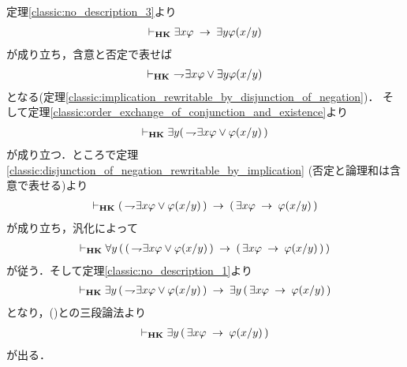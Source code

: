 	\begin{sketch}
		定理\ref{classic:no_description_3}より
		\begin{align}
			\vdash_{{\scriptsize \mbox{{\bf HK}}}} 
			\exists x \varphi \hspace{0.25em}\rightarrow\hspace{0.25em} \exists y \varphi(x/y)
		\end{align}
		が成り立ち，含意と否定で表せば
		\begin{align}
			\vdash_{{\scriptsize \mbox{{\bf HK}}}} 
			\ \rightharpoondown\hspace{-0.25em} \exists x \varphi \vee \exists y \varphi(x/y)
		\end{align}
		となる(定理\ref{classic:implication_rewritable_by_disjunction_of_negation})．
		そして定理\ref{classic:order_exchange_of_conjunction_and_existence}より
		\begin{align}
			\vdash_{{\scriptsize \mbox{{\bf HK}}}} 
			\exists y(\, \rightharpoondown\hspace{-0.25em} \exists x \varphi \vee \varphi(x/y)\, )
			\label{fom:lemma_for_Henkin_expansion_1}
		\end{align}
		が成り立つ．ところで定理\ref{classic:disjunction_of_negation_rewritable_by_implication}
		(否定と論理和は含意で表せる)より
		\begin{align}
			\vdash_{{\scriptsize \mbox{{\bf HK}}}} (\, \rightharpoondown\hspace{-0.25em} \exists x \varphi \vee \varphi(x/y)\, )
			\hspace{0.25em}\rightarrow\hspace{0.25em} (\, \exists x \varphi \hspace{0.25em}\rightarrow\hspace{0.25em} \varphi(x/y)\, )
		\end{align}
		が成り立ち，汎化によって
		\begin{align}
			\vdash_{{\scriptsize \mbox{{\bf HK}}}} \forall y\, (\, (\, \rightharpoondown\hspace{-0.25em} \exists x \varphi \vee \varphi(x/y)\, )
			\hspace{0.25em}\rightarrow\hspace{0.25em} (\, \exists x \varphi \hspace{0.25em}\rightarrow\hspace{0.25em} \varphi(x/y)\, )\, )
		\end{align}
		が従う．そして定理\ref{classic:no_description_1}より
		\begin{align}
			\vdash_{{\scriptsize \mbox{{\bf HK}}}} \exists y\, (\, \rightharpoondown\hspace{-0.25em} \exists x \varphi \vee \varphi(x/y)\, )
			\hspace{0.25em}\rightarrow\hspace{0.25em} \exists y\, (\, \exists x \varphi \hspace{0.25em}\rightarrow\hspace{0.25em} \varphi(x/y)\, )
		\end{align}
		となり，()との三段論法より
		\begin{align}
			\vdash_{{\scriptsize \mbox{{\bf HK}}}} \exists y\, (\, \exists x \varphi \hspace{0.25em}\rightarrow\hspace{0.25em} \varphi(x/y)\, )
		\end{align}
		が出る．
		\QED
	\end{sketch}